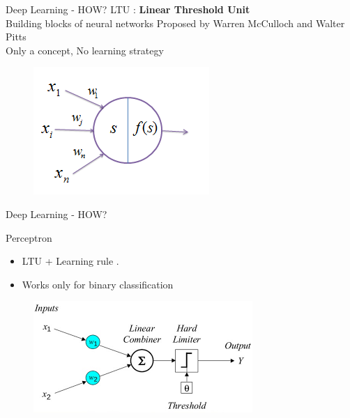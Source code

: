 \documentclass[10pt]{beamer}
\begin{document}
\begin{frame}[fragile]{Deep Learning - HOW?}
LTU  : 
\textbf{Linear Threshold Unit}\\
Building blocks of neural networks
Proposed by Warren McCulloch and Walter Pitts\\
Only a concept, No learning strategy

    \begin{figure}[ht]
      \hspace*{-1cm}\includegraphics[width=0.5\linewidth]{ltu_image}
    \end{figure}
\end{frame}
\begin{frame}[fragile]{Deep Learning - HOW?}

Perceptron
    \begin{itemize}
        \item LTU + Learning rule .
\pause        
        \item Works only for binary classification
    \end{itemize}
    \begin{figure}[ht]
      \hspace*{-1cm}\includegraphics[width=0.5\linewidth]{ltu}
    \end{figure}
\end{frame}
\end{document}
